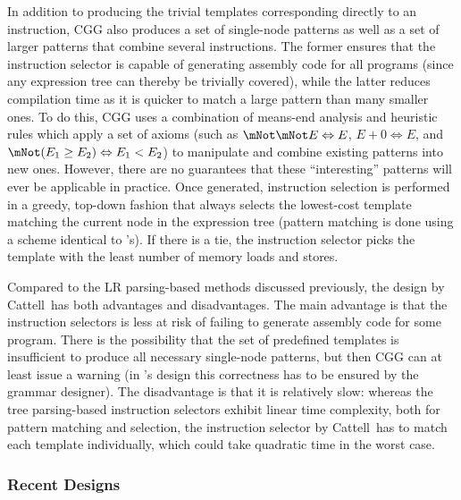 {In addition to producing the trivial \glspl{template} corresponding directly to
an \gls{instruction}, \gls{CGG} also produces a set of single-\gls{node}
\glspl{pattern} as well as a set of larger \glspl{pattern} that combine several
\glspl{instruction}.
%
The former ensures that the \gls{instruction selector} is capable of generating
\gls{assembly code} for all \glspl{program} (since any \gls{expression tree} can
thereby be trivially covered), while the latter reduces compilation time as it
is quicker to match a large \gls{pattern} than many smaller ones.
%
To do this, \gls{CGG} uses a combination of \gls{means-end analysis} and
heuristic \glspl{rule} which apply a set of axioms (such as \mbox{$\mNot \mNot E
  \Leftrightarrow E$}, \mbox{$E + 0 \Leftrightarrow E$}, and \mbox{$\mNot (E_1
  \geq E_2) \Leftrightarrow E_1 < E_2$}) to manipulate and combine existing
\glspl{pattern} into new ones.
%
However, there are no guarantees that these ``interesting'' \glspl{pattern} will
ever be applicable in practice.
%
Once generated, \gls{instruction selection} is performed in a greedy, top-down
fashion that always selects the lowest-cost \gls{template} matching the current
\gls{node} in the \gls{expression tree} (\gls{pattern matching} is done using a
scheme identical to \citeauthor{Newcomer1975}'s).
%
If there is a tie, the \gls{instruction selector} picks the \gls{template} with
the least number of memory loads and stores.

Compared to the \gls{LR parsing}-based methods discussed previously, the design
by Cattell~\etal has both advantages and disadvantages.
%
The main advantage is that the \glspl{instruction selector} is less at risk of
failing to generate \gls{assembly code} for some \gls{program}.
%
There is the possibility that the set of predefined \glspl{template} is
insufficient to produce all necessary single-node \glspl{pattern}, but then
\gls{CGG} can at least issue a warning (in \citeauthor{Ganapathi1982b}'s design
this correctness has to be ensured by the \gls{grammar} designer).
%
The disadvantage is that it is relatively slow: whereas the \gls{tree
  parsing}-based \glspl{instruction selector} exhibit linear time complexity,
both for \gls{pattern matching} and selection, the \gls{instruction selector} by
Cattell~\etal has to match each \gls{template} individually, which could take
quadratic time in the worst case.


\subsubsection{Recent Designs}

}
